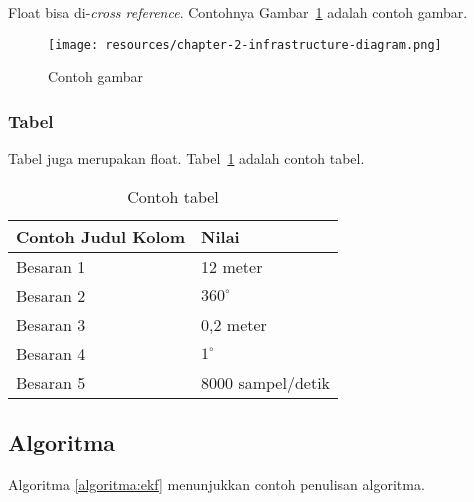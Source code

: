     Float bisa di-\textit{cross reference}. Contohnya Gambar~\ref{fig:contoh_gambar} adalah contoh gambar.

    \begin{figure}[h]
        \centering
        \texttt{[image: resources/chapter-2-infrastructure-diagram.png]}
        \caption[Contoh caption yang muncul di daftar]{Contoh gambar}
        \label{fig:contoh_gambar}
    \end{figure}

    \subsubsection{Tabel}

    Tabel juga merupakan float. Tabel~\ref{table:contoh_tabel} adalah contoh tabel.

    \begin{table}[htbp]
        \small
        \centering
        \caption{Contoh tabel}
        \label{table:contoh_tabel}
        \begin{tabular}{ll}
            \toprule
            \multicolumn{1}{l}{\textbf{Contoh Judul Kolom}} & \multicolumn{1}{l}{\textbf{Nilai}}\\
            \midrule
            Besaran 1 & 12 meter          \\
            Besaran 2 & $360^\circ$       \\
            Besaran 3 & 0,2 meter         \\
            Besaran 4 & $1^\circ$         \\
            Besaran 5 & 8000 sampel/detik \\
            \bottomrule
        \end{tabular}
    \end{table}

	\subsection{Algoritma}
	
	\blindtext Algoritma \ref{algoritma:ekf}  \parencite{leonard1991mobile, thrun2005probabilistic} menunjukkan contoh penulisan algoritma.
	
